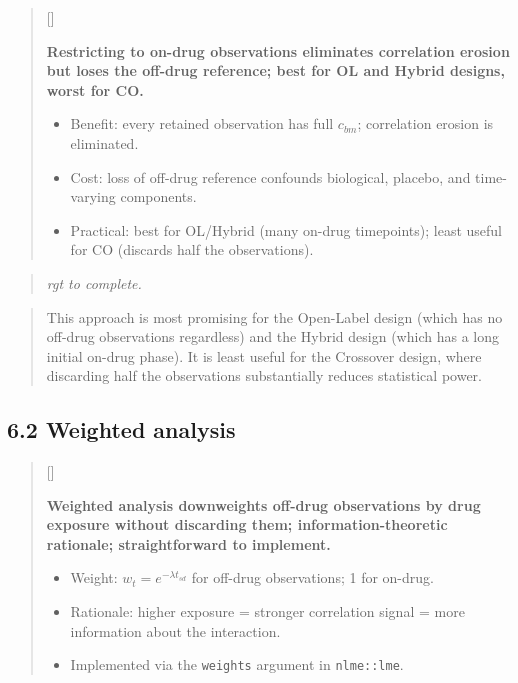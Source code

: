 \documentclass[
  11pt,
]{article}
\newcounter{pgraph}
\newenvironment{bullets}{%
  \stepcounter{pgraph}%
  \begin{quote}\small\sffamily\color[gray]{0.30}%
  {\normalfont\scriptsize\color[gray]{0.58}[\thepgraph]\enspace}}{%
  \end{quote}}
\newenvironment{rgt}{%
  \begin{quote}\small\itshape\color[RGB]{20,60,160}}{%
  \end{quote}}
\newenvironment{orig}{%
  \begin{quote}\normalsize\color[gray]{0.55}}{%
  \end{quote}}
\begin{document}
\begin{bullets}

\textbf{Restricting to on-drug observations eliminates
correlation erosion but loses the off-drug reference; best
for OL and Hybrid designs, worst for CO.}

\begin{itemize}\setlength{\itemsep}{2pt}\setlength{\parskip}{0pt}
\item Benefit: every retained observation has full $c_{bm}$;
  correlation erosion is eliminated.
\item Cost: loss of off-drug reference confounds biological,
  placebo, and time-varying components.
\item Practical: best for OL/Hybrid (many on-drug timepoints);
  least useful for CO (discards half the observations).
\end{itemize}

\end{bullets}

\begin{rgt}
rgt to complete.

\end{rgt}

\begin{orig}
This approach is most promising for the Open-Label design (which has no
off-drug observations regardless) and the Hybrid design (which has a
long initial on-drug phase). It is least useful for the Crossover
design, where discarding half the observations substantially reduces
statistical power.

\end{orig}

\subsection{6.2 Weighted analysis}

\begin{bullets}

\textbf{Weighted analysis downweights off-drug observations by
drug exposure without discarding them; information-theoretic
rationale; straightforward to implement.}

\begin{itemize}\setlength{\itemsep}{2pt}\setlength{\parskip}{0pt}
\item Weight: $w_t = e^{-\lambda t_{sd}}$ for off-drug
  observations; 1 for on-drug.
\item Rationale: higher exposure = stronger correlation signal
  = more information about the interaction.
\item Implemented via the \texttt{weights} argument in
  \texttt{nlme::lme}.
\end{itemize}

\end{bullets}
\end{document}
